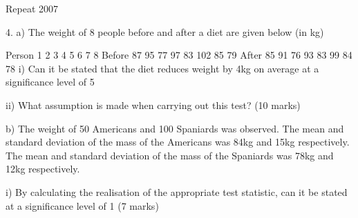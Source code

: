 Repeat 2007
 
4. a) The weight of 8 people before and after a diet are given below (in kg)
 
Person
1
2
3
4
5
6
7
8
Before
87
95
77
97
83
102
85
79
After
85
91
76
93
83
99
84
78
i) Can it be stated that the diet reduces weight by 4kg on average at a significance level of 5%
 
ii) What assumption is made when carrying out this test?
(10 marks)
 
b) The weight of 50 Americans and 100 Spaniards was observed. The mean and standard deviation of the mass of the Americans was 84kg and 15kg respectively. The mean and standard deviation of the mass of the Spaniards was 78kg and 12kg respectively.
 
i)                  By calculating the realisation of the appropriate test statistic, can it be stated at a significance level of 1%
(7 marks)
